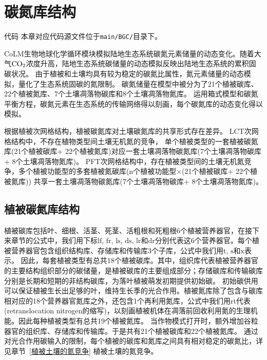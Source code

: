 \chapter{碳氮库结构}\label{碳氮库结构}
\begin{mymdframed}{代码}
  本章对应代码源文件位于\texttt{main/BGC/}目录下。
\end{mymdframed}

CoLM生物地球化学循环模块模拟陆地生态系统碳氮元素储量的动态变化。随着大气$\rm CO_2$浓度升高，陆地生态系统碳储量的动态模拟反映出陆地生态系统的累积固碳状况。
由于植被和土壤均具有较为稳定的碳氮比属性，氮元素储量的动态模拟，量化了生态系统固碳的氮限制。
碳氮储量在模型中被分为了21个植被碳库、22个植被氮库、7个土壤凋落物碳库和8个土壤凋落物氮库。
运用箱式模型和碳氮平衡方程，碳氮元素在生态系统的传输网络得以刻画，每个碳氮库的动态变化得以模拟。


根据植被次网格结构，植被碳氮库对土壤碳氮库的共享形式存在差异。
LCT次网格结构中，不存在植物类型间土壤无机氮的竞争，
单个植被类型的一套植被碳氮库(21个植被碳库+ 22个植被氮库)对应一套土壤凋落物碳氮库(7个土壤凋落物碳库+ 8个土壤凋落物氮库)。
PFT次网格结构中，存在植被类型间的土壤无机氮竞争，多个植被功能型的多套植被氮碳库(n个植被功能型×(21个植被碳库+ 22个植被氮库))
共享一套土壤凋落物碳氮库(7个土壤凋落物碳库+ 8个土壤凋落物氮库)。


\section{植被碳氮库结构}\label{植被碳氮库结构}
植被碳库包括叶、细根、活茎、死茎、活粗根和死粗根6个植被营养器官，在接下来章节的公式中，我们用下标${\mathrm {lf}}$, ${\mathrm {fr}}$, ${\mathrm {ls}}$, ${\mathrm {ds}}$, ${\mathrm {lr}}$和${\mathrm {dr}}$分别代表这6个营养器官。每个植被营养器官包含组织结构库、存储库和传输库3个子库，公式中我们用${\mathrm {t}}$, ${\mathrm {s}}$和${\mathrm {x}}$表示。
因此，每套植被类型有总共18个植被碳库。其中，组织库代表植被营养器官的主要结构组织部分的碳储量，是植被碳库的主要组成部分；存储碳库和传输碳库分别是长期和短期的非结构碳库，为落叶植被萌发初期提供初始碳。
初始碳供用可以保证植被生长出足够的叶，维持生长季的光合作用。植被氮库除了包含与碳库相对应的18个营养器官氮库之外，还包含1个再利用氮库，公式中我们用${\mathrm {rt}}$代表(retranslocation nitrogen的缩写)，以刻画植被机体在凋落前回收利用氮的生理机能。因此每种植被类型有总共19个植被氮库。
当作物模式打开时，额外增加谷粒器官的组织库、存储库和传输库。于是共有21个植被碳库和22个植被氮库。
通过对光合作用碳输入的限制，每个植被的碳库和氮库之间具有相对稳定的碳氮比，详见章节~\ref{植被土壤的氮竞争} 植被土壤的氮竞争。

